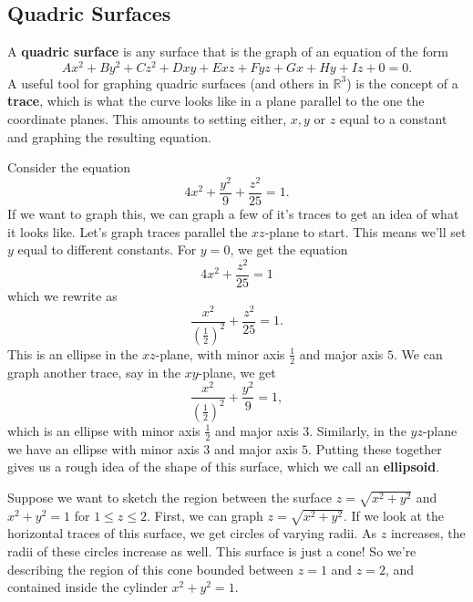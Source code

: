\documentclass[10pt,]{book}
\newcommand{\terminology}[1]{\textbf{#1}}
\theoremstyle{ptxplainnotitle}
\theoremstyle{ptxplaintitle}
\theoremstyle{ptxplainnotitle}
\theoremstyle{ptxplaintitle}
\theoremstyle{ptxplainnotitle}
\theoremstyle{ptxplaintitle}
\theoremstyle{ptxdefinitionnotitle}
\theoremstyle{ptxdefinitiontitle}
\theoremstyle{ptxdefinitionnotitle}
\theoremstyle{ptxdefinitiontitle}
\theoremstyle{ptxdefinitionnotitle}
\theoremstyle{ptxdefinitiontitle}
\theoremstyle{ptxdefinitionnotitle}
\theoremstyle{ptxdefinitiontitle}
\theoremstyle{ptxdefinitionnotitle}
\theoremstyle{ptxdefinitiontitle}
\numberwithin{equation}{section}
\newcommand{\RR}{\mathbb{R}}
\begin{document}
\subsection[{Quadric Surfaces}]{Quadric Surfaces}\label{subsection-quadric-surfaces}
\hypertarget{p-898}{}%
A \terminology{quadric surface} is any surface that is the graph of an equation of the form%
%
\begin{equation*}
Ax^{2}+By^{2}+Cz^{2}+Dxy+Exz+Fyz+Gx+Hy+Iz+0 = 0.
\end{equation*}
\hypertarget{p-899}{}%
A useful tool for graphing quadric surfaces (and others in \(\RR^{3}\)) is the concept of a \terminology{trace}, which is what the curve looks like in a plane parallel to the one the coordinate planes. This amounts to setting either, \(x,y\) or \(z\) equal to a constant and graphing the resulting equation.%
\begin{example}[{An ellipsoid.}]\label{example-an-ellipsoid}
\hypertarget{p-900}{}%
Consider the equation%
%
\begin{equation*}
4x^{2}+\frac{y^{2}}{9}+\frac{z^{2}}{25} = 1.
\end{equation*}
\hypertarget{p-901}{}%
If we want to graph this, we can graph a few of it's traces to get an idea of what it looks like. Let's graph traces parallel the \(xz\)-plane to start. This means we'll set \(y\) equal to different constants. For \(y=0\), we get the equation%
%
\begin{equation*}
4x^{2}+\frac{z^{2}}{25} = 1
\end{equation*}
\hypertarget{p-902}{}%
which we rewrite as%
%
\begin{equation*}
\frac{x^{2}}{(\frac{1}{2})^{2}}+\frac{z^{2}}{25} = 1.
\end{equation*}
\hypertarget{p-903}{}%
This is an ellipse in the \(xz\)-plane, with minor axis \(\frac{1}{2}\) and major axis \(5\). We can graph another trace, say in the \(xy\)-plane, we get%
%
\begin{equation*}
\frac{x^{2}}{(\frac{1}{2})^{2}}+\frac{y^{2}}{9} = 1,
\end{equation*}
\hypertarget{p-904}{}%
which is an ellipse with minor axis \(\frac{1}{2}\) and major axis \(3\). Similarly, in the \(yz\)-plane we have an ellipse with minor axis \(3\) and major axis \(5\). Putting these together gives us a rough idea of the shape of this surface, which we call an \terminology{ellipsoid}.%
\end{example}
\begin{example}\label{example-region-between-surfaces}
\hypertarget{p-905}{}%
Suppose we want to sketch the region between the surface \(z=\sqrt{x^{2}+y^{2}}\) and \(x^{2}+y^{2}=1\) for \(1\leq z\leq 2\). First, we can graph \(z=\sqrt{x^{2}+y^{2}}\). If we look at the horizontal traces of this surface, we get circles of varying radii. As \(z\) increases, the radii of these circles increase as well. This surface is just a cone! So we're describing the region of this cone bounded between \(z=1\) and \(z=2\), and contained inside the cylinder \(x^{2}+y^{2}=1\).%
\end{example}
\end{document}
